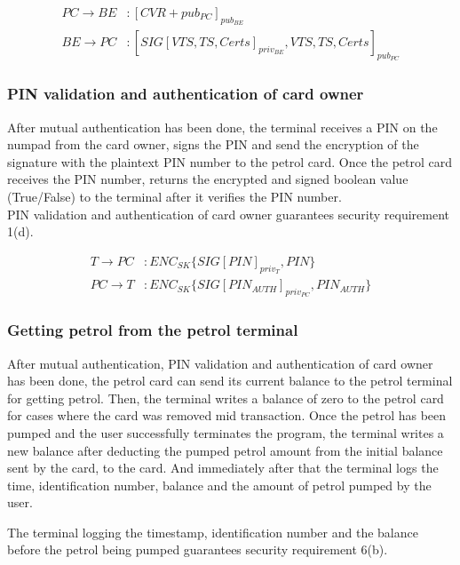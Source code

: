 \begin{equation}\nonumber
\begin{split}
PC \to BE &: [CVR + pub_{PC}]_{pub_{BE}}\\
BE \to PC &: [SIG[VTS, TS, Certs]_{priv_{BE}}, VTS, TS, Certs]_{pub_{PC}}
\end{split} 
\end{equation}
\subsubsection{PIN validation and authentication of card owner}
After mutual authentication has been done, the terminal receives a PIN on the numpad from the card owner, signs the PIN and send the encryption of the signature with the plaintext PIN number to the petrol card. Once the petrol card receives the PIN number, returns the encrypted and signed boolean value (True/False) to the terminal after it verifies the PIN number. \\

PIN validation and authentication of card owner guarantees security requirement 1(d).

\begin{equation}\nonumber
\begin{split}
T \to PC&: ENC_{SK}\{SIG[PIN]_{priv_T}, PIN\}\\
PC \to T&: ENC_{SK}\{SIG[PIN_{AUTH}]_{priv_{PC}}, PIN_{AUTH}\}
\end{split} 
\end{equation}

\subsubsection{Getting petrol from the petrol terminal}
After mutual authentication, PIN validation and authentication of card owner has been done, the petrol card can send its current balance to the petrol terminal for getting petrol. Then, the terminal writes a balance of zero to the petrol card for cases where the card was removed mid transaction. Once the petrol has been pumped and the user successfully terminates the program, the terminal writes a new balance after deducting the pumped petrol amount from the initial balance sent by the card, to the card. And immediately after that the terminal logs the time, identification number, balance and the amount of petrol pumped by the user.

The terminal logging the timestamp, identification number and the balance before the petrol being pumped guarantees security requirement 6(b).

